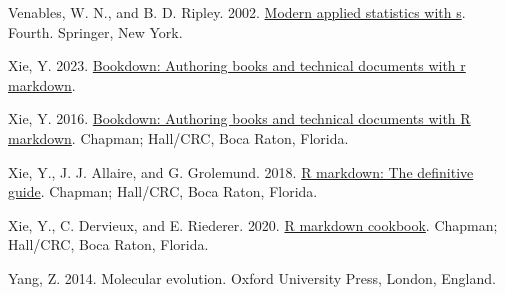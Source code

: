 \documentclass[fleqn,10pt,lineno]{wlpeerj} %
\newlength{\cslhangindent}
\newlength{\cslentryspacingunit} %
\newenvironment{CSLReferences}[2] %
 {%
  \setlength{\parindent}{0pt}
  \ifodd #1
  \let\oldpar\par
  \def\par{\hangindent=\cslhangindent\oldpar}
  \fi
  \setlength{\parskip}{#2\cslentryspacingunit}
 }%
 {}
\begin{document}
\begin{CSLReferences}{1}{0}
\leavevmode{}%
Venables, W. N., and B. D. Ripley. 2002. \href{https://www.stats.ox.ac.uk/pub/MASS4/}{Modern applied statistics with s}. Fourth. Springer, New York.

\leavevmode{}%
Xie, Y. 2023. \href{https://github.com/rstudio/bookdown}{Bookdown: Authoring books and technical documents with r markdown}.

\leavevmode{}%
Xie, Y. 2016. \href{https://bookdown.org/yihui/bookdown}{Bookdown: Authoring books and technical documents with {R} markdown}. Chapman; Hall/CRC, Boca Raton, Florida.

\leavevmode{}%
Xie, Y., J. J. Allaire, and G. Grolemund. 2018. \href{https://bookdown.org/yihui/rmarkdown}{R markdown: The definitive guide}. Chapman; Hall/CRC, Boca Raton, Florida.

\leavevmode{}%
Xie, Y., C. Dervieux, and E. Riederer. 2020. \href{https://bookdown.org/yihui/rmarkdown-cookbook}{R markdown cookbook}. Chapman; Hall/CRC, Boca Raton, Florida.

\leavevmode{}%
Yang, Z. 2014. Molecular evolution. Oxford University Press, London, England.

\end{CSLReferences}
\end{document}
